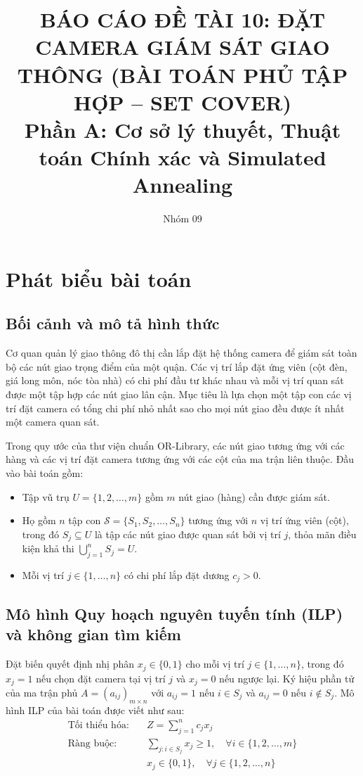 \documentclass[11pt, a4paper]{article}
\title{\textbf{BÁO CÁO ĐỀ TÀI 10: ĐẶT CAMERA GIÁM SÁT GIAO THÔNG (BÀI TOÁN PHỦ TẬP HỢP -- SET COVER)}\\
\large Phần A: Cơ sở lý thuyết, Thuật toán Chính xác và Simulated Annealing}
\author{Nhóm 09}
\date{}
\begin{document}
\maketitle

\section{Phát biểu bài toán}

\subsection{Bối cảnh và mô tả hình thức}
Cơ quan quản lý giao thông đô thị cần lắp đặt hệ thống camera để giám sát toàn bộ các nút giao trọng điểm của một quận. Các vị trí lắp đặt ứng viên (cột đèn, giá long môn, nóc tòa nhà) có chi phí đầu tư khác nhau và mỗi vị trí quan sát được một tập hợp các nút giao lân cận. Mục tiêu là lựa chọn một tập con các vị trí đặt camera có tổng chi phí nhỏ nhất sao cho mọi nút giao đều được ít nhất một camera quan sát.

Trong quy ước của thư viện chuẩn OR-Library, các nút giao tương ứng với các hàng và các vị trí đặt camera tương ứng với các cột của ma trận liên thuộc. Đầu vào bài toán gồm:
\begin{itemize}
    \item Tập vũ trụ $U = \{1, 2, \dots, m\}$ gồm $m$ nút giao (hàng) cần được giám sát.
    \item Họ gồm $n$ tập con $\mathcal{S} = \{S_1, S_2, \dots, S_n\}$ tương ứng với $n$ vị trí ứng viên (cột), trong đó $S_j \subseteq U$ là tập các nút giao được quan sát bởi vị trí $j$, thỏa mãn điều kiện khả thi $\bigcup_{j=1}^{n} S_j = U$.
    \item Mỗi vị trí $j \in \{1, \dots, n\}$ có chi phí lắp đặt dương $c_j > 0$.
\end{itemize}

\subsection{Mô hình Quy hoạch nguyên tuyến tính (ILP) và không gian tìm kiếm}
Đặt biến quyết định nhị phân $x_j \in \{0, 1\}$ cho mỗi vị trí $j \in \{1, \dots, n\}$, trong đó $x_j = 1$ nếu chọn đặt camera tại vị trí $j$ và $x_j = 0$ nếu ngược lại. Ký hiệu phần tử của ma trận phủ $A = (a_{ij})_{m \times n}$ với $a_{ij} = 1$ nếu $i \in S_j$ và $a_{ij} = 0$ nếu $i \notin S_j$. Mô hình ILP của bài toán được viết như sau:
\begin{align}
\text{Tối thiểu hóa:} \quad & Z = \sum_{j=1}^{n} c_j x_j \\
\text{Ràng buộc:} \quad & \sum_{j : i \in S_j} x_j \ge 1, \quad \forall i \in \{1, 2, \dots, m\} \\
& x_j \in \{0, 1\}, \quad \forall j \in \{1, 2, \dots, n\}
\end{align}
\end{document}
